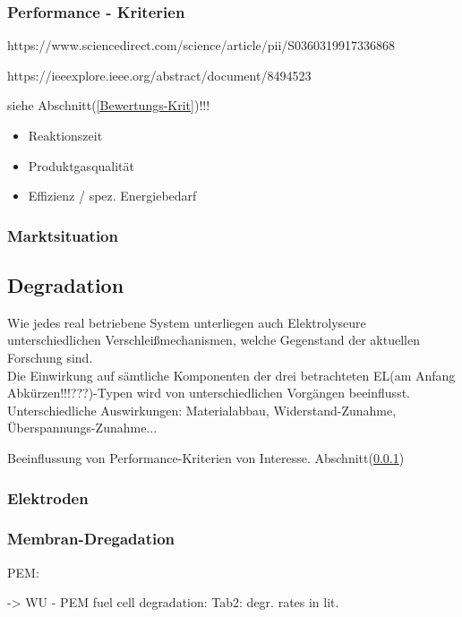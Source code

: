 \documentclass[onecolumn,10pt,titlepage]{article}
\begin{document}
\subsubsection{Performance - Kriterien}
\label{peformance-krit}
https://www.sciencedirect.com/science/article/pii/S0360319917336868

https://ieeexplore.ieee.org/abstract/document/8494523
 
siehe Abschnitt(\ref{Bewertungs-Krit})!!!
\begin{itemize}
	\item Reaktionszeit
	\item Produktgasqualität
	\item Effizienz / spez. Energiebedarf
\end{itemize}


\subsubsection{Marktsituation}


\subsection{Degradation}
Wie jedes real betriebene System unterliegen auch Elektrolyseure unterschiedlichen Verschleißmechanismen, welche Gegenstand der aktuellen Forschung sind.\\
Die Einwirkung auf sämtliche Komponenten der drei betrachteten EL(am Anfang Abkürzen!!!???)-Typen wird von unterschiedlichen Vorgängen beeinflusst.\\
Unterschiedliche Auswirkungen: Materialabbau, Widerstand-Zunahme, Überspannungs-Zunahme...

Beeinflussung von Performance-Kriterien von Interesse. %
Abschnitt(\ref{peformance-krit})

\subsubsection{Elektroden}


\subsubsection{Membran-Dregadation}

PEM:


\cite{wu2008review}
-> WU - PEM fuel cell degradation: Tab2: degr. rates in  lit.
\end{document}
